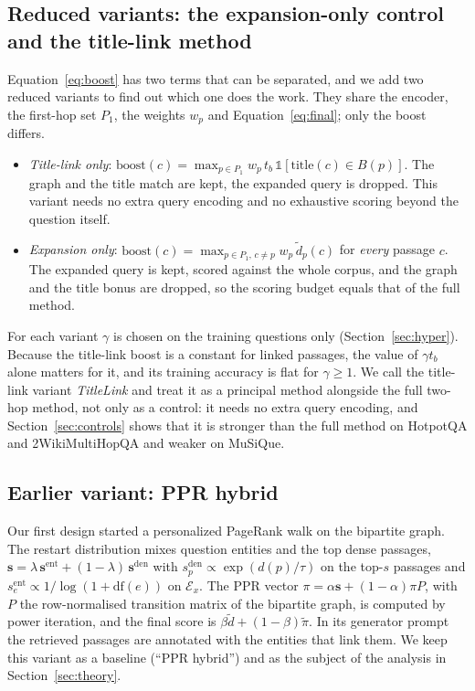\documentclass[a4paper,fleqn]{cas-sc}
\begin{document}
\subsection{Reduced variants: the expansion-only control and the title-link method}\label{sec:variants}
Equation~\eqref{eq:boost} has two terms that can be separated, and we add two reduced variants to find out which one does the work. They share the encoder, the first-hop set $P_1$, the weights $w_p$ and Equation~\eqref{eq:final}; only the boost differs.
\begin{itemize}\setlength\itemsep{0pt}
\item \emph{Title-link only}: $\mathrm{boost}(c)=\max_{p\in P_1} w_p\,t_b\,\mathbb{1}[\mathrm{title}(c)\in B(p)]$. The graph and the title match are kept, the expanded query is dropped. This variant needs no extra query encoding and no exhaustive scoring beyond the question itself.
\item \emph{Expansion only}: $\mathrm{boost}(c)=\max_{p\in P_1,\,c\ne p} w_p\,\widetilde d_p(c)$ for \emph{every} passage $c$. The expanded query is kept, scored against the whole corpus, and the graph and the title bonus are dropped, so the scoring budget equals that of the full method.
\end{itemize}
For each variant $\gamma$ is chosen on the training questions only (Section~\ref{sec:hyper}). Because the title-link boost is a constant for linked passages, the value of $\gamma t_b$ alone matters for it, and its training accuracy is flat for $\gamma\ge1$. We call the title-link variant \emph{TitleLink} and treat it as a principal method alongside the full two-hop method, not only as a control: it needs no extra query encoding, and Section~\ref{sec:controls} shows that it is stronger than the full method on HotpotQA and 2WikiMultiHopQA and weaker on MuSiQue.

\subsection{Earlier variant: PPR hybrid}\label{sec:ppr}
Our first design started a personalized PageRank walk on the bipartite graph. The restart distribution mixes question entities and the top dense passages, $\mathbf{s}=\lambda\,\mathbf{s}^{\mathrm{ent}}+(1-\lambda)\,\mathbf{s}^{\mathrm{den}}$ with $s^{\mathrm{den}}_p\propto\exp(d(p)/\tau)$ on the top-$s$ passages and $s^{\mathrm{ent}}_e\propto1/\log(1+\mathrm{df}(e))$ on $\mathcal{E}_x$. The PPR vector $\pi=\alpha\mathbf{s}+(1-\alpha)\pi P$, with $P$ the row-normalised transition matrix of the bipartite graph, is computed by power iteration, and the final score is $\beta\widetilde d+(1-\beta)\widetilde\pi$. In its generator prompt the retrieved passages are annotated with the entities that link them. We keep this variant as a baseline (``PPR hybrid'') and as the subject of the analysis in Section~\ref{sec:theory}.
\end{document}
